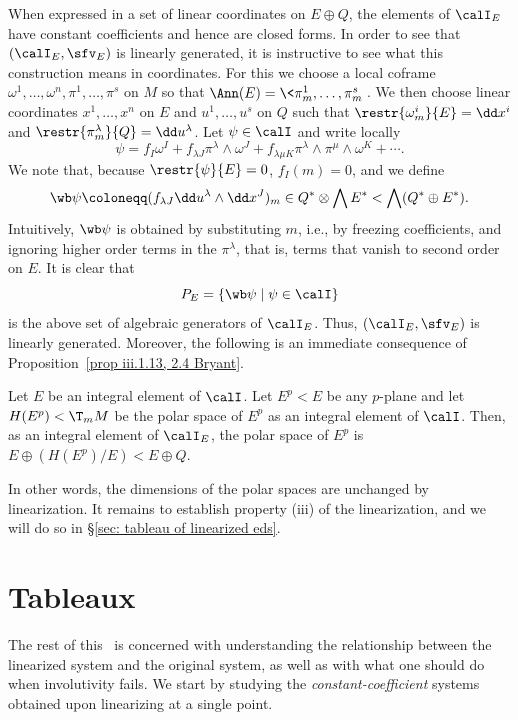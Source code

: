 When expressed in a set of linear coordinates on $E\oplus Q$, the elements of $\calI_E$ have constant coefficients and hence are closed forms. In order to see that $(\calI_E,\sfv_E)$ is linearly generated, it is instructive to see what this construction means in coordinates. For this we choose a local coframe $\omega^1,\ldots,\omega^n,\pi^1,\ldots,\pi^s$ on $M$ so that $\Ann(E)=\<\pi^1_m,\ldots,\pi^s_m\>$. We then choose linear coordinates $x^1,\ldots,x^n$ on $E$ and $u^1,\ldots,u^s$ on $Q$ such that $\restr{\omega^i_m}{E}=\dd x^i$ and $\restr{\pi^\lambda_m}{Q}=\dd u^\lambda$. Let $\psi\in\calI$ and write locally
\[\psi=f_I\omega^I+f_{\lambda J}\pi^\lambda\wedge\omega^J+f_{\lambda\mu K}\pi^\lambda\wedge\pi^\mu\wedge\omega^K+\cdots.\]
We note that, because $\restr{\psi}{E}=0$, $f_I(m)=0$, and we define 
\[\wb\psi\coloneqq (f_{\lambda J}\dd u^\lambda\wedge\dd x^J)_m\in Q^\ast \otimes \bigwedge E^\ast < \bigwedge(Q^\ast\oplus E^\ast).\label{eq iv.17 Bryant}\]
Intuitively, $\wb\psi$ is obtained by substituting $m$, i.e., by freezing coefficients, and ignoring higher order terms in the $\pi^\lambda$, that is, terms that vanish to second order on $E$. It is clear that 
\[P_E=\{\wb\psi\mid \psi\in\calI\}\label{eq iv.3.18 Bryant}\]
is the above set of algebraic generators of $\calI_E$. Thus, $(\calI_E,\sfv_E)$ is linearly generated. Moreover, the following is an immediate consequence of Proposition~\ref{prop iii.1.13, 2.4 Bryant}.


\begin{prop}\label{prop iv.2.6 Bryant}
    Let $E$ be an integral element of $\calI$. Let $E^p<E$ be any $p$-plane and let $H(E^p)<\T_m M$ be the polar space of $E^p$ as an integral element of $\calI$. Then, as an integral element of $\calI_E$, the polar space of $E^p$ is $E\oplus (H(E^p)\slash E)<E\oplus Q$.
\end{prop}
In other words, the dimensions of the polar spaces are unchanged by linearization. It remains to establish property (iii) of the linearization, and we will do so in \S\ref{sec: tableau of linearized eds}.








\section{Tableaux}\label{sec tableaux}

The rest of this \chap\ is concerned with understanding the relationship between the linearized system and the original system, as well as with what one should do when involutivity fails. We start by studying the \emph{constant-coefficient} systems obtained upon linearizing at a single point.



